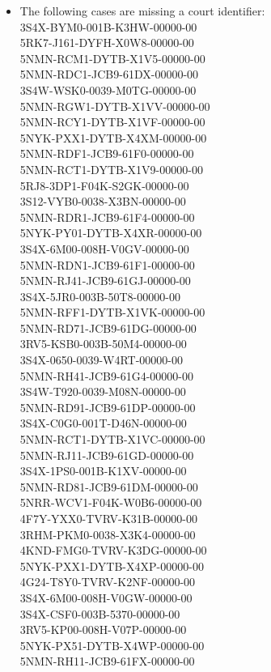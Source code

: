 \documentclass[10pt, letterpaper]{article}
\begin{document}
\begin{spacing}{1.0}
\begin{itemize}
    \item {\color{red}The following cases are missing a court identifier}:\\
    3S4X-BYM0-001B-K3HW-00000-00\\
    5RK7-J161-DYFH-X0W8-00000-00\\
    5NMN-RCM1-DYTB-X1V5-00000-00\\
    5NMN-RDC1-JCB9-61DX-00000-00\\
    3S4W-WSK0-0039-M0TG-00000-00\\
    5NMN-RGW1-DYTB-X1VV-00000-00\\
    5NMN-RCY1-DYTB-X1VF-00000-00\\
    5NYK-PXX1-DYTB-X4XM-00000-00\\
    5NMN-RDF1-JCB9-61F0-00000-00\\
    5NMN-RCT1-DYTB-X1V9-00000-00\\
    5RJ8-3DP1-F04K-S2GK-00000-00\\
    3S12-VYB0-0038-X3BN-00000-00\\
    5NMN-RDR1-JCB9-61F4-00000-00\\
    5NYK-PY01-DYTB-X4XR-00000-00\\
    3S4X-6M00-008H-V0GV-00000-00\\
    5NMN-RDN1-JCB9-61F1-00000-00\\
    5NMN-RJ41-JCB9-61GJ-00000-00\\
    3S4X-5JR0-003B-50T8-00000-00\\
    5NMN-RFF1-DYTB-X1VK-00000-00\\
    5NMN-RD71-JCB9-61DG-00000-00\\
    3RV5-KSB0-003B-50M4-00000-00\\
    3S4X-0650-0039-W4RT-00000-00\\
    5NMN-RH41-JCB9-61G4-00000-00\\
    3S4W-T920-0039-M08N-00000-00\\
    5NMN-RD91-JCB9-61DP-00000-00\\
    3S4X-C0G0-001T-D46N-00000-00\\
    5NMN-RCT1-DYTB-X1VC-00000-00\\
    5NMN-RJ11-JCB9-61GD-00000-00\\
    3S4X-1PS0-001B-K1XV-00000-00\\
    5NMN-RD81-JCB9-61DM-00000-00\\
    5NRR-WCV1-F04K-W0B6-00000-00\\
    4F7Y-YXX0-TVRV-K31B-00000-00\\
    3RHM-PKM0-0038-X3K4-00000-00\\
    4KND-FMG0-TVRV-K3DG-00000-00\\
    5NYK-PXX1-DYTB-X4XP-00000-00\\
    4G24-T8Y0-TVRV-K2NF-00000-00\\
    3S4X-6M00-008H-V0GW-00000-00\\
    3S4X-CSF0-003B-5370-00000-00\\
    3RV5-KP00-008H-V07P-00000-00\\
    5NYK-PX51-DYTB-X4WP-00000-00\\
    5NMN-RH11-JCB9-61FX-00000-00\\
    

\end{itemize}
\end{spacing}
\end{document}
